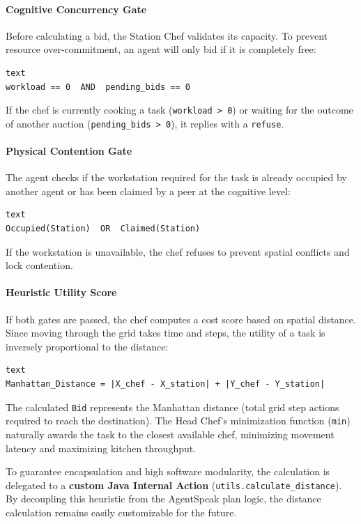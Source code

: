 \documentclass{scrartcl}
\begin{document}
\paragraph{Cognitive Concurrency Gate}
Before calculating a bid, the Station Chef validates its capacity. To prevent resource over-commitment, an agent will only bid if it is completely free:
\begin{lstlisting}text
workload == 0  AND  pending_bids == 0
\end{lstlisting}
If the chef is currently cooking a task (\texttt{workload > 0}) or waiting for the outcome of another auction (\texttt{pending\_bids > 0}), it replies with a \texttt{refuse}.

\paragraph{Physical Contention Gate}
The agent checks if the workstation required for the task is already occupied by another agent or has been claimed by a peer at the cognitive level:
\begin{lstlisting}text
Occupied(Station)  OR  Claimed(Station)
\end{lstlisting}
If the workstation is unavailable, the chef refuses to prevent spatial conflicts and lock contention.

\paragraph{Heuristic Utility Score}
If both gates are passed, the chef computes a cost score based on spatial distance. Since moving through the grid takes time and steps, the utility of a task is inversely proportional to the distance:
\begin{lstlisting}text
Manhattan_Distance = |X_chef - X_station| + |Y_chef - Y_station|
\end{lstlisting}
The calculated \texttt{Bid} represents the Manhattan distance (total grid step actions required to reach the destination). The Head Chef's minimization function (\texttt{min}) naturally awards the task to the closest available chef, minimizing movement latency and maximizing kitchen throughput.

To guarantee encapsulation and high software modularity, the calculation is delegated to a \textbf{custom Java Internal Action} (\texttt{utils.calculate\_distance}). By decoupling this heuristic from the AgentSpeak plan logic, the distance calculation remains easily customizable for the future.
\end{document}

